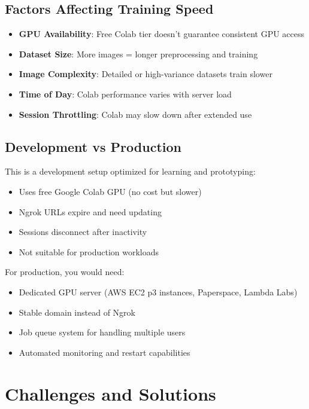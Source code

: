 \documentclass[11pt,a4paper]{article}
\begin{document}
\subsection{Factors Affecting Training Speed}

\begin{itemize}[noitemsep]
    \item \textbf{GPU Availability}: Free Colab tier doesn't guarantee consistent GPU access
    \item \textbf{Dataset Size}: More images = longer preprocessing and training
    \item \textbf{Image Complexity}: Detailed or high-variance datasets train slower
    \item \textbf{Time of Day}: Colab performance varies with server load
    \item \textbf{Session Throttling}: Colab may slow down after extended use
\end{itemize}

\subsection{Development vs Production}

This is a development setup optimized for learning and prototyping:
\begin{itemize}[noitemsep]
    \item Uses free Google Colab GPU (no cost but slower)
    \item Ngrok URLs expire and need updating
    \item Sessions disconnect after inactivity
    \item Not suitable for production workloads
\end{itemize}

For production, you would need:
\begin{itemize}[noitemsep]
    \item Dedicated GPU server (AWS EC2 p3 instances, Paperspace, Lambda Labs)
    \item Stable domain instead of Ngrok
    \item Job queue system for handling multiple users
    \item Automated monitoring and restart capabilities
\end{itemize}

\section{Challenges and Solutions}
\end{document}
